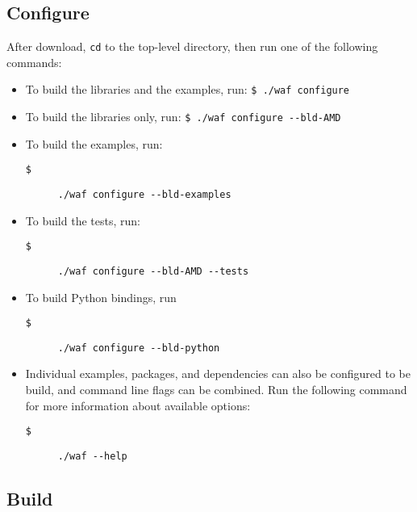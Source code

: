 \subsection{Configure}

After download, \texttt{cd} to the top-level directory, then run one
of the following commands:

\begin{itemize}
\item To build the libraries and the examples, run: \texttt{\$ ./waf configure}

\item To build the libraries only, run: \texttt{\$ ./waf configure
-{}-bld-AMD}

\item To build the examples, run:

\begin{description}
\item [{\texttt{\$}}] \texttt{./waf configure -{}-bld-examples}
\end{description}
\item To build the tests, run:

\begin{description}
\item [{\texttt{\$}}] \texttt{./waf configure -{}-bld-AMD -{}-tests}
\end{description}

\item To build Python bindings, run

\begin{description}
\item [{\texttt{\$}}] \texttt{./waf configure -{}-bld-python}
\end{description}

\item Individual examples, packages, and dependencies can also be configured
to be build, and command line flags can be combined. Run the following
command for more information about available options:

\begin{description}
\item [{\texttt{\$}}] \texttt{./waf -{}-help}
\end{description}
\end{itemize}

\subsection{Build}

